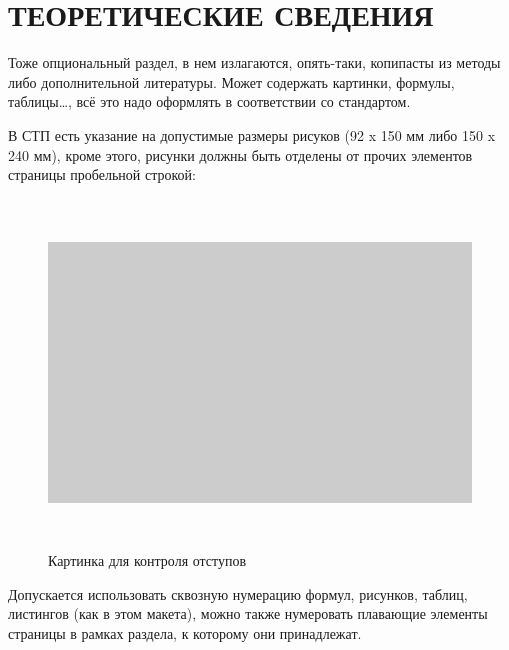 \section{ТЕОРЕТИЧЕСКИЕ СВЕДЕНИЯ}

Тоже опциональный раздел, в нем излагаются, опять-таки, копипасты из методы либо
дополнительной литературы.
Может содержать картинки, формулы, таблицы\dots, всё это надо оформлять
в соответствии со стандартом.

В СТП есть указание на допустимые размеры рисуков (92 x 150 мм либо 150 x 240 мм),
кроме этого, рисунки должны быть отделены от прочих элементов страницы пробельной строкой:

  \begin{figure}[htbp]
    \centering
    \includegraphics[width=150mm,height=92mm]{pic/scheme_p}
    \caption{Картинка для контроля отступов}
  \end{figure}

Допускается использовать сквозную нумерацию формул, рисунков, таблиц, листингов (как в этом макета),
можно также нумеровать плавающие элементы страницы в рамках раздела, к которому они принадлежат.
